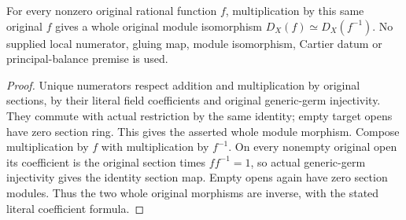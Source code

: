 \begin{theorem}
\label{thm:fc-scheme-denominator-reciprocal-iso}
\leanok
{}
For every nonzero original rational function $f$, multiplication by this
same original $f$ gives a whole original module isomorphism
$D_X(f)\simeq D_X(f^{-1})$. No supplied local numerator, gluing map,
module isomorphism, Cartier datum or principal-balance premise is used.
\end{theorem}
\begin{proof}
Unique numerators respect addition and multiplication by original
sections, by their literal field coefficients and original generic-germ
injectivity. They commute with actual restriction by the same identity;
empty target opens have zero section ring. This gives the asserted whole
module morphism. Compose multiplication by $f$ with multiplication by
$f^{-1}$. On every nonempty original open its coefficient is the original
section times $ff^{-1}=1$, so actual generic-germ injectivity gives the
identity section map. Empty opens again have zero section modules. Thus
the two whole original morphisms are inverse, with the stated literal
coefficient formula.
\end{proof}
